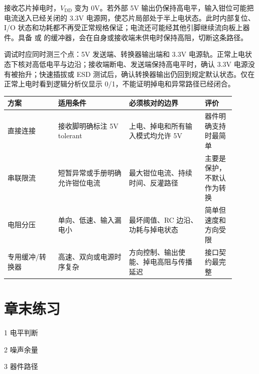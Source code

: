 接收芯片掉电时，$V_{\mathrm{DD}}$ 变为 0V。若外部 5V 输出仍保持高电平，输入钳位可能把电流送入已经关闭的 3.3V 电源网，使芯片局部处于半上电状态。此时内部复位、I/O 状态和功耗都不再受正常规格保证；电流还可能经其他引脚继续流向板上器件。具备  或  的缓冲器，会在自身或接收端未供电时保持高阻，切断这条路径。

调试时应同时测三个点：5V 发送端、转换器输出端和 3.3V 电源轨。正常上电状态下核对高低电平与边沿；接收端断电、发送端保持高电平时，确认 3.3V 电源没有被抬升；快速插拔或 ESD 测试后，确认转换器输出仍回到规定默认状态。仅在正常上电时看到逻辑分析仪显示 0/1，不能证明掉电和异常路径已经闭合。

\begin{longtable}{L{0.20\linewidth}L{0.28\linewidth}L{0.30\linewidth}L{0.12\linewidth}}
\toprule
方案 & 适用条件 & 必须核对的边界 & 评价 \\
\midrule
直接连接 & 接收脚明确标注 5V tolerant & 上电、掉电和所有输入模式均允许 5V & 器件明确支持时最简单 \\\tablerowrule
串联限流 & 短暂异常或手册明确允许钳位电流 & 最大钳位电流、持续时间、反灌路径 & 主要是保护，不默认作为转换 \\\tablerowrule
电阻分压 & 单向、低速、输入漏电小 & 最坏阈值、RC 边沿、功耗与掉电状态 & 简单但速度和方向受限 \\\tablerowrule
专用缓冲/转换器 & 高速、双向或电源时序复杂 & 方向控制、输出使能、掉电高阻与传播延迟 & 接口契约最完整 \\
\bottomrule
\end{longtable}

\section*{章末练习}

\begin{chapterexercise}{1}
电平判断
\end{chapterexercise}

\begin{chapterexercise}{2}
噪声余量
\end{chapterexercise}

\begin{chapterexercise}{3}
器件路径
\end{chapterexercise}

